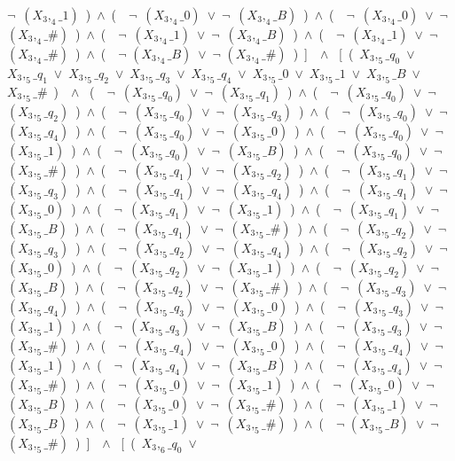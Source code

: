 ﻿\documentclass[a4paper,10pt]{article}
\begin{document}
$\neg$\ $(X_3,_4\_1)$\ )\ $\wedge$\ (\ \ $\neg$\ $(X_3,_4\_0)$\ $\vee$\ $\neg$\ $(X_3,_4\_B)$\ )\ $\wedge$\ (\ \ $\neg$\ $(X_3,_4\_0)$\ $\vee$\ $\neg$\ $(X_3,_4\_\#)$\ )\ $\wedge$\ (\ \ $\neg$\ $(X_3,_4\_1)$\ $\vee$\ $\neg$\ $(X_3,_4\_B)$\ )\ $\wedge$\ (\ \ $\neg$\ $(X_3,_4\_1)$\ $\vee$\ $\neg$\ $(X_3,_4\_\#)$\ )\ $\wedge$\ (\ \ $\neg$ $(X_3,_4\_B)$\ $\vee$\ $\neg$ $(X_3,_4\_\#)$\ )\ ]\ \ $\wedge$ \ [\ (\ $X_3,_5\_q_0$\ $\vee$\ $X_3,_5\_q_1$\ $\vee$\ $X_3,_5\_q_2$\ $\vee$\ $X_3,_5\_q_3$\ $\vee$\ $X_3,_5\_q_4$\ $\vee$\ $X_3,_5\_0$\ $\vee$\ $X_3,_5\_1$\ $\vee$\ $X_3,_5\_B$\ $\vee$\ $X_3,_5\_\#$\ )\ \ $\wedge$ \ (\ \ $\neg$\ $(X_3,_5\_q_0)$\ $\vee$\ $\neg$\ $(X_3,_5\_q_1)$\ )\ $\wedge$\ (\ \ $\neg$\ $(X_3,_5\_q_0)$\ $\vee$\ $\neg$\ $(X_3,_5\_q_2)$\ )\ $\wedge$\ (\ \ $\neg$\ $(X_3,_5\_q_0)$\ $\vee$\ $\neg$\ $(X_3,_5\_q_3)$\ )\ $\wedge$\ (\ \ $\neg$\ $(X_3,_5\_q_0)$\ $\vee$\ $\neg$\ $(X_3,_5\_q_4)$\ )\ $\wedge$\ (\ \ $\neg$\ $(X_3,_5\_q_0)$\ $\vee$\ $\neg$\ $(X_3,_5\_0)$\ )\ $\wedge$\ (\ \ $\neg$\ $(X_3,_5\_q_0)$\ $\vee$\ $\neg$\ $(X_3,_5\_1)$\ )\ $\wedge$\ (\ \ $\neg$\ $(X_3,_5\_q_0)$\ $\vee$\ $\neg$\ $(X_3,_5\_B)$\ )\ $\wedge$\ (\ \ $\neg$\ $(X_3,_5\_q_0)$\ $\vee$\ $\neg$\ $(X_3,_5\_\#)$\ )\ $\wedge$\ (\ \ $\neg$\ $(X_3,_5\_q_1)$\ $\vee$\ $\neg$\ $(X_3,_5\_q_2)$\ )\ $\wedge$\ (\ \ $\neg$\ $(X_3,_5\_q_1)$\ $\vee$\ $\neg$\ $(X_3,_5\_q_3)$\ )\ $\wedge$\ (\ \ $\neg$\ $(X_3,_5\_q_1)$\ $\vee$\ $\neg$\ $(X_3,_5\_q_4)$\ )\ $\wedge$\ (\ \ $\neg$\ $(X_3,_5\_q_1)$\ $\vee$\ $\neg$\ $(X_3,_5\_0)$\ )\ $\wedge$\ (\ \ $\neg$\ $(X_3,_5\_q_1)$\ $\vee$\ $\neg$\ $(X_3,_5\_1)$\ )\ $\wedge$\ (\ \ $\neg$\ $(X_3,_5\_q_1)$\ $\vee$\ $\neg$\ $(X_3,_5\_B)$\ )\ $\wedge$\ (\ \ $\neg$\ $(X_3,_5\_q_1)$\ $\vee$\ $\neg$\ $(X_3,_5\_\#)$\ )\ $\wedge$\ (\ \ $\neg$\ $(X_3,_5\_q_2)$\ $\vee$\ $\neg$\ $(X_3,_5\_q_3)$\ )\ $\wedge$\ (\ \ $\neg$\ $(X_3,_5\_q_2)$\ $\vee$\ $\neg$\ $(X_3,_5\_q_4)$\ )\ $\wedge$\ (\ \ $\neg$\ $(X_3,_5\_q_2)$\ $\vee$\ $\neg$\ $(X_3,_5\_0)$\ )\ $\wedge$\ (\ \ $\neg$\ $(X_3,_5\_q_2)$\ $\vee$\ $\neg$\ $(X_3,_5\_1)$\ )\ $\wedge$\ (\ \ $\neg$\ $(X_3,_5\_q_2)$\ $\vee$\ $\neg$\ $(X_3,_5\_B)$\ )\ $\wedge$\ (\ \ $\neg$\ $(X_3,_5\_q_2)$\ $\vee$\ $\neg$\ $(X_3,_5\_\#)$\ )\ $\wedge$\ (\ \ $\neg$\ $(X_3,_5\_q_3)$\ $\vee$\ $\neg$\ $(X_3,_5\_q_4)$\ )\ $\wedge$\ (\ \ $\neg$\ $(X_3,_5\_q_3)$\ $\vee$\ $\neg$\ $(X_3,_5\_0)$\ )\ $\wedge$\ (\ \ $\neg$\ $(X_3,_5\_q_3)$\ $\vee$\ $\neg$\ $(X_3,_5\_1)$\ )\ $\wedge$\ (\ \ $\neg$\ $(X_3,_5\_q_3)$\ $\vee$\ $\neg$\ $(X_3,_5\_B)$\ )\ $\wedge$\ (\ \ $\neg$\ $(X_3,_5\_q_3)$\ $\vee$\ $\neg$\ $(X_3,_5\_\#)$\ )\ $\wedge$\ (\ \ $\neg$\ $(X_3,_5\_q_4)$\ $\vee$\ $\neg$\ $(X_3,_5\_0)$\ )\ $\wedge$\ (\ \ $\neg$\ $(X_3,_5\_q_4)$\ $\vee$\ $\neg$\ $(X_3,_5\_1)$\ )\ $\wedge$\ (\ \ $\neg$\ $(X_3,_5\_q_4)$\ $\vee$\ $\neg$\ $(X_3,_5\_B)$\ )\ $\wedge$\ (\ \ $\neg$\ $(X_3,_5\_q_4)$\ $\vee$\ $\neg$\ $(X_3,_5\_\#)$\ )\ $\wedge$\ (\ \ $\neg$\ $(X_3,_5\_0)$\ $\vee$\ $\neg$\ $(X_3,_5\_1)$\ )\ $\wedge$\ (\ \ $\neg$\ $(X_3,_5\_0)$\ $\vee$\ $\neg$\ $(X_3,_5\_B)$\ )\ $\wedge$\ (\ \ $\neg$\ $(X_3,_5\_0)$\ $\vee$\ $\neg$\ $(X_3,_5\_\#)$\ )\ $\wedge$\ (\ \ $\neg$\ $(X_3,_5\_1)$\ $\vee$\ $\neg$\ $(X_3,_5\_B)$\ )\ $\wedge$\ (\ \ $\neg$\ $(X_3,_5\_1)$\ $\vee$\ $\neg$\ $(X_3,_5\_\#)$\ )\ $\wedge$\ (\ \ $\neg$ $(X_3,_5\_B)$\ $\vee$\ $\neg$ $(X_3,_5\_\#)$\ )\ ]\ \ $\wedge$ \ [\ (\ $X_3,_6\_q_0$\ $\vee$\ 
\end{document}
